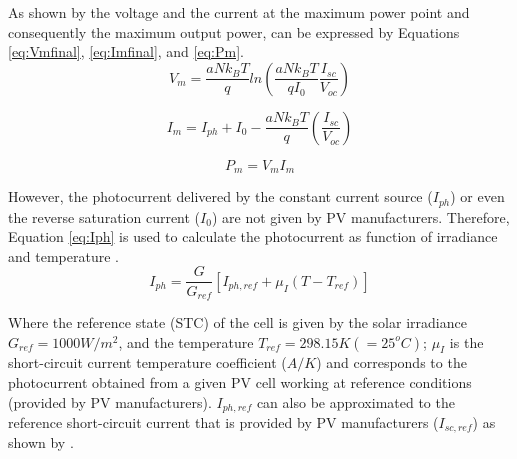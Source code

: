 \documentclass[journal]{IEEEtran}
\begin{document}
%
%

As shown by \cite{Saloux} the voltage and the current at the maximum power point and consequently the maximum output power, can be expressed by Equations \ref{eq:Vmfinal}, \ref{eq:Imfinal}, and \ref{eq:Pm}. %
\begin{equation}
\label{eq:Vmfinal}
V_{m}=\dfrac{aNk_{B}T}{q} ln \left( \dfrac{aNk_{B}T}{qI_{0}} \dfrac{I_{sc}}{V_{oc}}  \right) 
\end{equation}

\begin{equation}
\label{eq:Imfinal}
I_{m} = I_{ph} + I_{0} - \dfrac{aNk_{B}T}{q} \left( \dfrac{I_{sc}}{V_{oc}} \right)  
\end{equation}

\begin{equation}
\label{eq:Pm}
P_{m} = V_{m} I_{m}
\end{equation}

%
However, the photocurrent delivered by the constant current source ($ I_{ph} $) or even the reverse saturation current ($ I_{0} $) are not given by PV manufacturers. Therefore, Equation \ref{eq:Iph} is used to calculate the photocurrent as function of irradiance and temperature \cite{Villalva}.
\begin{equation}
\label{eq:Iph}
I_{ph}=\dfrac{G}{G_{ref}} \left[ I_{ph,ref} + \mu_{I} \left( T-T_{ref} \right)    \right] 
\end{equation}

Where the reference state (STC) of the cell is given by the solar irradiance $ G_{ref}=1000 W/m^{2} $, and the temperature $ T_{ref}=298.15 K (=25^{o}C) $; $ \mu_{I} $ is the short-circuit current temperature coefficient ($A/K$) and corresponds to the photocurrent obtained from a given PV cell working at reference conditions (provided by PV manufacturers). $ I_{ph,ref} $ can also be approximated to the reference short-circuit current that is provided by PV manufacturers ($ I_{sc,ref} $) as shown by \cite{Jakhrani}.
\end{document}
